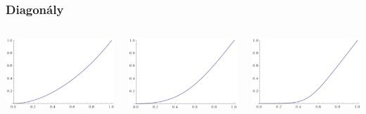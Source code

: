 \documentclass{beamer}
\begin{document}
\begin{frame}
\frametitle{Diagonály}
\begin{columns}
\begin{minipage}[c][0.4\textheight][c]{\linewidth}
  \centering
  \includegraphics[width=0.7\linewidth]{FT/FT0_5-diag}
\end{minipage}
\begin{minipage}[c][0.4\textheight][c]{\linewidth}
  \centering
  \includegraphics[width=0.7\linewidth]{FT/FT7-diag}
\end{minipage}
\begin{minipage}[c][0.4\textheight][c]{\linewidth}
  \centering
  \includegraphics[width=0.7\linewidth]{FT/FT750-diag}

\end{minipage}
\end{columns}
\end{frame}
\end{document}
